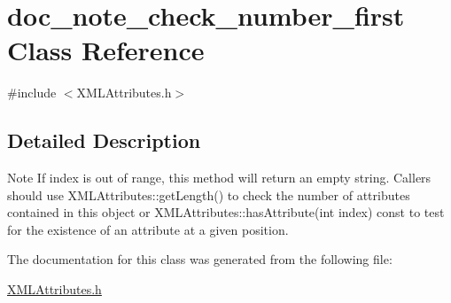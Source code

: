 \hypertarget{classdoc__note__check__number__first}{}\section{doc\+\_\+note\+\_\+check\+\_\+number\+\_\+first Class Reference}
\label{classdoc__note__check__number__first}


{\ttfamily \#include $<$X\+M\+L\+Attributes.\+h$>$}



\subsection{Detailed Description}
\begin{DoxyNote}{Note}
If {\ttfamily index} is out of range, this method will return an empty string. Callers should use X\+M\+L\+Attributes\+::get\+Length() to check the number of attributes contained in this object or X\+M\+L\+Attributes\+::has\+Attribute(int index) const to test for the existence of an attribute at a given position. 
\end{DoxyNote}


The documentation for this class was generated from the following file\+:\begin{DoxyCompactItemize}
\item 
\hyperlink{_x_m_l_attributes_8h}{X\+M\+L\+Attributes.\+h}\end{DoxyCompactItemize}
